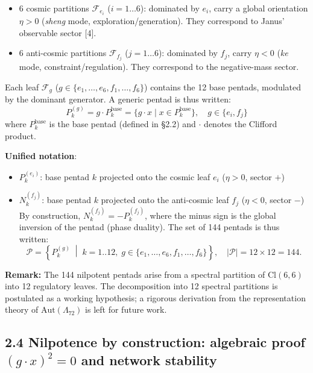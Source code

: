 \documentclass[11pt]{article}
\providecommand{\tightlist}{\setlength{\itemsep}{2pt}\setlength{\parskip}{6pt}}
\let\oldmathcal\mathcal
\renewcommand{\mathcal}[1]{\oldmathcal{#1}}
\providecommand{\tightlist}{%
  \setlength{\itemsep}{2pt}\setlength{\parskip}{6pt}
}
\begin{document}
\begin{itemize}
\tightlist
\item
  6 cosmic partitions \(\mathcal{F}_{e_i}\) (\(i=1\dots6\)): dominated
  by \(e_i\), carry a global orientation \(\eta>0\) (\textit{sheng}
  mode, exploration/generation). They correspond to Janus' observable
  sector {[}4{]}.
\item
  6 anti-cosmic partitions \(\mathcal{F}_{f_j}\) (\(j=1\dots6\)):
  dominated by \(f_j\), carry \(\eta<0\) (\textit{ke} mode,
  constraint/regulation). They correspond to the negative-mass sector.
\end{itemize}

Each leaf \(\mathcal{F}_{g}\)
(\(g \in \{e_1,\dots,e_6,f_1,\dots,f_6\}\)) contains the 12 base
pentads, modulated by the dominant generator. A generic pentad is thus
written:
\[P_k^{(g)} = g \cdot P_k^{\text{base}} = \{g \cdot x \mid x \in P_k^{\text{base}}\}, \quad g \in \{e_i, f_j\}\]
where \(P_k^{\text{base}}\) is the base pentad (defined in §2.2) and
\(\cdot\) denotes the Clifford product.

\textbf{Unified notation}:

\begin{itemize}
\tightlist
\item
  \(P_k^{(e_i)}\): base pentad \(k\) projected onto the cosmic leaf
  \(e_i\) (\(\eta>0\), sector \(+\))
\item
  \(N_k^{(f_j)}\): base pentad \(k\) projected onto the anti-cosmic leaf
  \(f_j\) (\(\eta<0\), sector \(-\)) By construction,
  \(N_k^{(f_j)} = -P_k^{(f_j)}\), where the minus sign is the global
  inversion of the pentad (phase duality). The set of 144 pentads is
  thus written:
  \[\mathcal{P} = \left\{ P_k^{(g)} \;\middle|\; k=1..12,\; g \in \{e_1,\dots,e_6,f_1,\dots,f_6\} \right\}, \quad |\mathcal{P}| = 12 \times 12 = 144.\]
\end{itemize}

\textbf{Remark:} The 144 nilpotent pentads arise from a spectral
partition of \(\mathrm{Cl}(6,6)\) into 12 regulatory leaves. The
decomposition into 12 spectral partitions is postulated as a working
hypothesis; a rigorous derivation from the representation theory of
\(\mathrm{Aut}(\Lambda_{72})\) is left for future work.

\hypertarget{nilpotence-by-construction-algebraic-proof-gcdot-x2-0-and-network-stability}{%
\subsection{\texorpdfstring{2.4 Nilpotence by construction: algebraic
proof \((g\cdot x)^2 = 0\) and network
stability}{2.4 Nilpotence by construction: algebraic proof (g\textbackslash cdot x)\^{}2 = 0 and network stability}}\label{nilpotence-by-construction-algebraic-proof-gcdot-x2-0-and-network-stability}}
\end{document}
